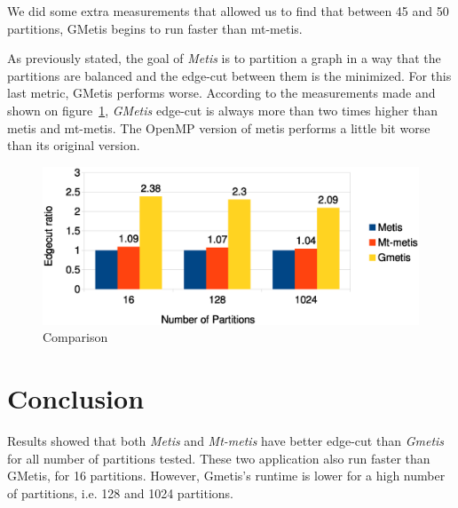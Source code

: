 \documentclass[abstract=on,9pt,twocolumn]{scrartcl}
\begin{document}
We did some extra measurements that allowed us to find that between 45 and 50
partitions, GMetis begins to run faster than mt-metis.


As previously stated, the goal of \textit{Metis} is to partition a
graph in a way that the partitions are balanced and the edge-cut between
them is the minimized. For this last metric, GMetis performs
worse. According to the measurements made and shown on figure~\ref{img:edgecut},
\textit{GMetis} edge-cut is always more than two times higher than metis
and mt-metis. The OpenMP version of metis performs a little bit worse
than its original version.

\begin{center}
\begin{figure}[htb]
    \includegraphics[width=\columnwidth]{img/edgecut.eps}
    \caption{Comparison}
    \label{img:edgecut}
\end{figure}
\end{center}



\section{Conclusion}
\label{sec:conc}
Results showed that both \textit{Metis} and \textit{Mt-metis} have
better edge-cut than \textit{Gmetis} for all number of partitions tested. 
These two application also run faster than GMetis, for 16 partitions.
However, Gmetis's runtime is lower for a high number of partitions, i.e.
128 and 1024 partitions.
\end{document}
